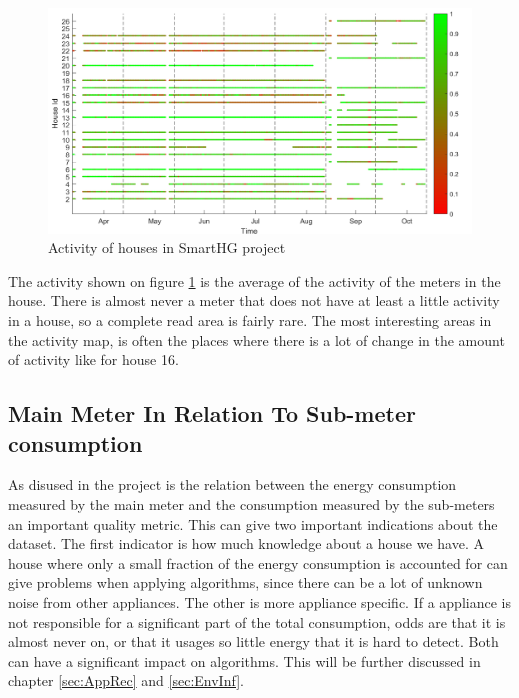 \begin{figure}[H]
\centering
\includegraphics[width=1\textwidth]{billeder/ActivityBig.png}
\caption{Activity of houses in SmartHG project}
\label{fig:ActivityMap}
\end{figure}

The activity shown on figure \ref{fig:ActivityMap} is the average of the activity of the meters in the house. There is almost never a meter that does not have at least a little activity in a house, so a complete read area is fairly rare. The most interesting areas in the activity map, is often the places where there is a lot of change in the amount of activity like for house 16.

\subsection{Main Meter In Relation To Sub-meter consumption}
\label{sec:MMIRTSM}
As disused in the  project \citep{RefWorks:21} is the relation between the energy consumption measured by the main meter and the consumption measured by the sub-meters an important quality metric. This can give two important indications about the dataset. The first indicator is how much knowledge about a house we have. A house where only a small fraction of the energy consumption is accounted for can give problems when applying  algorithms, since there can be a lot of unknown noise from other appliances. The other is more appliance specific. If a appliance is not responsible for a significant part of the total consumption, odds are that it is almost never on, or that it usages so little energy that it is hard to detect. Both can have a significant impact on  algorithms. This will be further discussed in chapter \ref{sec:AppRec} and \ref{sec:EnvInf}.  


